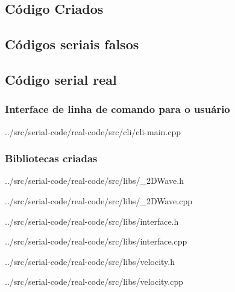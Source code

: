 \begin{appendices}
\chapter{Código Criados}
\section{Códigos seriais falsos}

\section{Código serial real}
	\subsection{Interface de linha de comando para o usuário}
	
	{../src/serial-code/real-code/src/cli/cli-main.cpp}

	\subsection{Bibliotecas criadas}
	
	{../src/serial-code/real-code/src/libs/_2DWave.h}
	
	
	{../src/serial-code/real-code/src/libs/_2DWave.cpp}
	
	
	{../src/serial-code/real-code/src/libs/interface.h}
	
	
	{../src/serial-code/real-code/src/libs/interface.cpp}
	
	
	{../src/serial-code/real-code/src/libs/velocity.h}
	
	
	{../src/serial-code/real-code/src/libs/velocity.cpp}


\end{appendices}
